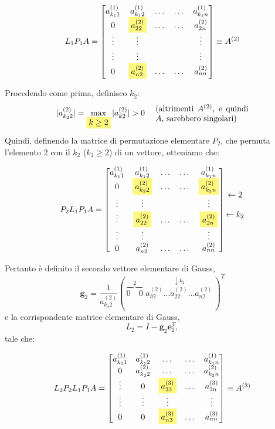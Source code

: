 \[
L_1 P_1 A = 
\begin{bmatrix}
a_{k_1 1}^{(1)} & a_{k_1 2}^{(1)} & \dots & \dots & a_{k_1 n}^{(1)} \\
0 & \colorbox{yellow!50}{$a_{22}^{(2)}$} & \dots & \dots & a_{2n}^{(2)} \\
\vdots & \vdots & & & \vdots \\
\vdots & \vdots & & & \vdots \\
0 & \colorbox{yellow!50}{$a_{n2}^{(2)}$} & \dots & \dots & a_{nn}^{(2)}
\end{bmatrix}
\equiv A^{(2)}
\]

Procedendo come prima, definisco $k_2$:
\[
|a_{k_2 2}^{(2)}| = \max_{\colorbox{yellow!50}{$k \ge 2$}} |a_{k 2}^{(2)}| \colorbox{white}{$> 0$} \quad \parbox{4cm}{(altrimenti $A^{(2)}$, e quindi $A$, sarebbero singolari)}
\]
Quindi, definendo la matrice di permutazione elementare $P_2$, che permuta l'elemento 2 con il $k_2$ ($k_2 \ge 2$) di un vettore, otteniamo che:

\[
P_2 L_1 P_1 A = 
\begin{bmatrix}
a_{k_1 1}^{(1)} & a_{k_1 2}^{(1)} & \dots & \dots & a_{k_1 n}^{(1)} \\
0 & \colorbox{yellow!50}{$a_{k_2 2}^{(2)}$} & \dots & \dots & \colorbox{yellow!50}{$a_{k_2 n}^{(2)}$} \\
\vdots & \vdots & & & \vdots \\
\vdots & \colorbox{yellow!50}{$a_{22}^{(2)}$} & \dots & \dots & \colorbox{yellow!50}{$a_{2n}^{(2)}$} \\
\vdots & \vdots & & & \vdots \\
0 & a_{n2}^{(2)} & \dots & \dots & a_{nn}^{(2)}
\end{bmatrix}
\begin{matrix} \\ \leftarrow 2 \\ \\ \leftarrow k_2 \\ \\ \\ \end{matrix}
\]

Pertanto è definito il secondo vettore elementare di Gauss,
\[
\mathbf{g}_2 = \frac{1}{a_{k_2 2}^{(2)}} (\, \overbrace{0 \quad 0}^{2} \,\, a_{32}^{(2)} \dots \overset{\downarrow k_2}{a_{22}^{(2)}} \dots a_{n2}^{(2)} \, )^T
\]
e la corrispondente matrice elementare di Gauss,
\[
L_2 = I - \mathbf{g}_2 \mathbf{e}_2^T,
\]
tale che:

\[
L_2 P_2 L_1 P_1 A = 
\begin{bmatrix}
a_{k_1 1}^{(1)} & a_{k_1 2}^{(1)} & \dots & \dots & a_{k_1 n}^{(1)} \\
0 & a_{k_2 2}^{(2)} & \dots & \dots & a_{k_2 n}^{(2)} \\
\vdots & 0 & \colorbox{yellow!50}{$a_{33}^{(3)}$} & \dots & a_{3n}^{(3)} \\
\vdots & \vdots & \vdots & & \vdots \\
0 & 0 & \colorbox{yellow!50}{$a_{n3}^{(3)}$} & \dots & a_{nn}^{(3)}
\end{bmatrix}
\equiv A^{(3)}
\]


